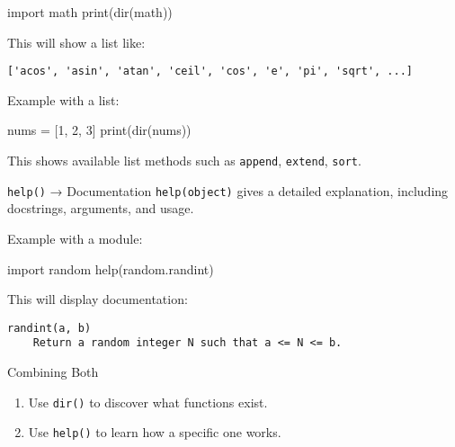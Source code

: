 \documentclass[
  letterpaper,
  DIV=11,
  numbers=noendperiod]{scrreprt}
\newenvironment{Shaded}{\begin{snugshade}}{\end{snugshade}}
\newcommand{\BuiltInTok}[1]{\textcolor[rgb]{0.00,0.23,0.31}{#1}}
\newcommand{\DecValTok}[1]{\textcolor[rgb]{0.68,0.00,0.00}{#1}}
\newcommand{\ImportTok}[1]{\textcolor[rgb]{0.00,0.46,0.62}{#1}}
\newcommand{\NormalTok}[1]{\textcolor[rgb]{0.00,0.23,0.31}{#1}}
\newcommand{\OperatorTok}[1]{\textcolor[rgb]{0.37,0.37,0.37}{#1}}
\providecommand{\tightlist}{%
  \setlength{\itemsep}{0pt}\setlength{\parskip}{0pt}}
\begin{document}
\begin{Shaded}
\begin{Highlighting}[]
\ImportTok{import}\NormalTok{ math}
\BuiltInTok{print}\NormalTok{(}\BuiltInTok{dir}\NormalTok{(math))}
\end{Highlighting}
\end{Shaded}

This will show a list like:

\begin{verbatim}
['acos', 'asin', 'atan', 'ceil', 'cos', 'e', 'pi', 'sqrt', ...]
\end{verbatim}

Example with a list:

\begin{Shaded}
\begin{Highlighting}[]
\NormalTok{nums }\OperatorTok{=}\NormalTok{ [}\DecValTok{1}\NormalTok{, }\DecValTok{2}\NormalTok{, }\DecValTok{3}\NormalTok{]}
\BuiltInTok{print}\NormalTok{(}\BuiltInTok{dir}\NormalTok{(nums))}
\end{Highlighting}
\end{Shaded}

This shows available list methods such as \texttt{append},
\texttt{extend}, \texttt{sort}.

\texttt{help()} → Documentation \texttt{help(object)} gives a detailed
explanation, including docstrings, arguments, and usage.

Example with a module:

\begin{Shaded}
\begin{Highlighting}[]
\ImportTok{import}\NormalTok{ random}
\BuiltInTok{help}\NormalTok{(random.randint)}
\end{Highlighting}
\end{Shaded}

This will display documentation:

\begin{verbatim}
randint(a, b)
    Return a random integer N such that a <= N <= b.
\end{verbatim}

Combining Both

\begin{enumerate}
\def\labelenumi{\arabic{enumi}.}
\tightlist
\item
  Use \texttt{dir()} to discover what functions exist.
\item
  Use \texttt{help()} to learn how a specific one works.
\end{enumerate}
\end{document}
